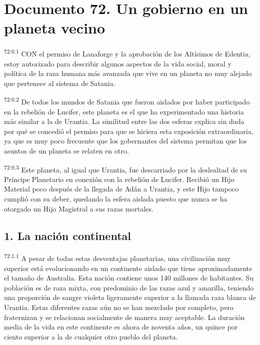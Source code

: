 \chapter{Documento 72. Un gobierno en un planeta vecino}
\par
\textsuperscript{72:0.1} CON el permiso de Lanaforge y la aprobación de los Altísimos de Edentia, estoy autorizado para describir algunos aspectos de la vida social, moral y política de la raza humana más avanzada que vive en un planeta no muy alejado que pertenece al sistema de Satania.

\par
\textsuperscript{72:0.2} De todos los mundos de Satania que fueron aislados por haber participado en la rebelión de Lucifer, este planeta es el que ha experimentado una historia más similar a la de Urantia. La similitud entre las dos esferas explica sin duda por qué se concedió el permiso para que se hiciera esta exposición extraordinaria, ya que es muy poco frecuente que los gobernantes del sistema permitan que los asuntos de un planeta se relaten en otro.

\par
\textsuperscript{72:0.3} Este planeta, al igual que Urantia, fue descarriado por la deslealtad de su Príncipe Planetario en conexión con la rebelión de Lucifer. Recibió un Hijo Material poco después de la llegada de Adán a Urantia, y este Hijo tampoco cumplió con su deber, quedando la esfera aislada puesto que nunca se ha otorgado un Hijo Magistral a sus razas mortales.

\section*{1. La nación continental}
\par
\textsuperscript{72:1.1} A pesar de todas estas desventajas planetarias, una civilización muy superior está evolucionando en un continente aislado que tiene aproximadamente el tamaño de Australia. Esta nación contiene unos 140 millones de habitantes. Su población es de raza mixta, con predominio de las razas azul y amarilla, teniendo una proporción de sangre violeta ligeramente superior a la llamada raza blanca de Urantia. Estas diferentes razas aún no se han mezclado por completo, pero fraternizan y se relacionan socialmente de manera muy aceptable. La duración media de la vida en este continente es ahora de noventa años, un quince por ciento superior a la de cualquier otro pueblo del planeta.


